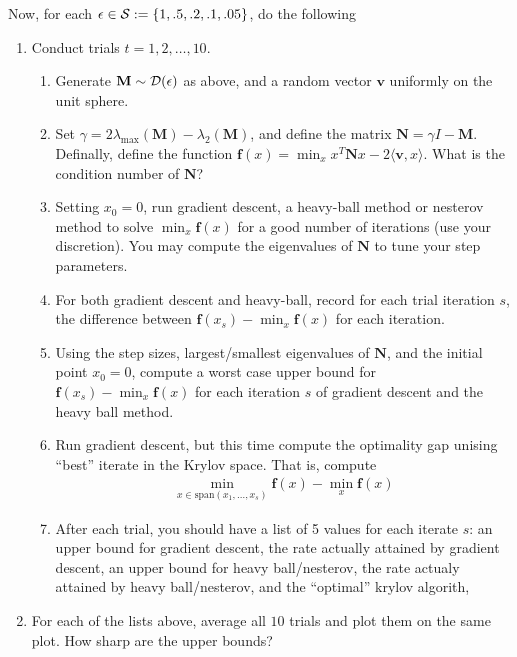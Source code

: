 \documentclass[12pt]{article}
\begin{document}
	Now, for each $\epsilon \in {\cal S} := \{1,.5,.2,.1,.05\}$, do the following
	\begin{enumerate}
		\item Conduct trials $t = 1,2,\dots,10$.
		\begin{enumerate}
		\item Generate $\mathbf{M} \sim {\cal D}(\epsilon)$ as above, and a random vector $\mathbf{v}$ uniformly on the unit sphere. 
		\item Set $\gamma = 2\lambda_{\max}(\mathbf{M}) - \lambda_{2}(\mathbf{M})$, and define the matrix $\mathbf{N} = \gamma I  - \mathbf{M}$. Definally, define the function $\mathbf{f}(x) = \min_{x} x^T \mathbf{N} x - 2 \langle \mathbf{v}, x \rangle$. What is the condition number of $\mathbf{N}$?
		\item Setting $x_0 = 0$, run gradient descent, a heavy-ball method or nesterov method to solve $\min_{x} \mathbf{f}(x)$ for a good number of iterations (use your discretion). You may compute the eigenvalues of $\mathbf{N}$ to tune your step parameters. 
		\item For both gradient descent and heavy-ball, record for each trial iteration $s$, the difference between $\mathbf{f}(x_s) - \min_{x} \mathbf{f}(x)$ for each iteration. 
		\item Using the step sizes, largest/smallest eigenvalues of $\mathbf{N}$, and the initial point $x_0 = 0$, compute a worst case upper bound for $\mathbf{f}(x_s) - \min_{x} \mathbf{f}(x)$ for each iteration $s$ of gradient descent and the heavy ball method.
		\item Run gradient descent, but this time compute the optimality gap unising ``best'' iterate in the Krylov space. That is, compute 
		\begin{eqnarray}
		\min_{x \in \mathrm{span}(x_1,\dots,x_s)}\mathbf{f}(x) - \min_{x} \mathbf{f}(x)
		\end{eqnarray}
		\item After each trial, you should have a list of 5 values for each iterate $s$: an upper bound for gradient descent, the rate actually attained by gradient descent, an upper bound for heavy ball/nesterov, the rate actualy attained by heavy ball/nesterov, and the ``optimal'' krylov algorith,
	\end{enumerate}
	\item For each of the lists above, average all $10$ trials and plot them on the same plot. How sharp are the upper bounds?
	\end{enumerate}
\end{document}
